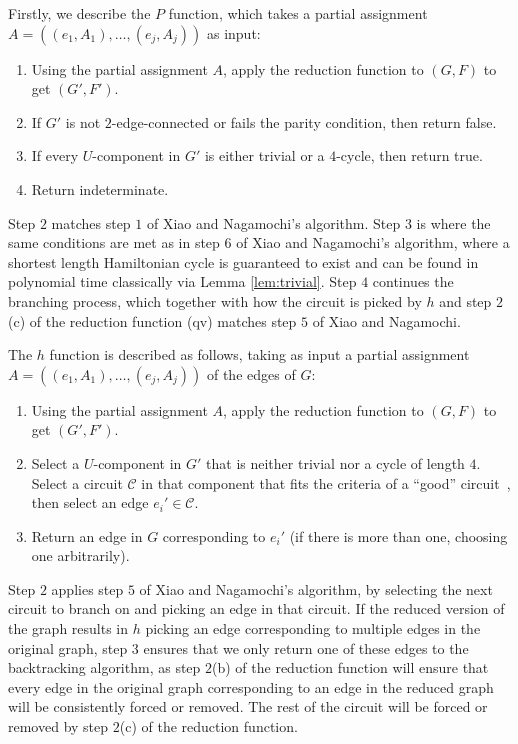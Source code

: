 Firstly, we describe the $P$ function, which takes a partial assignment $A = ((e_1, A_1),\dots,(e_j, A_j))$ as input:

\begin{enumerate}
\item Using the partial assignment $A$, apply the reduction function to $(G, F)$ to get $(G', F')$.
\item If $G'$ is not $2$-edge-connected or fails the parity condition, then return false.
\item If every $U$-component in $G'$ is either trivial or a $4$-cycle, then return true.
\item Return indeterminate.
\end{enumerate}

Step $2$ matches step $1$ of Xiao and Nagamochi's algorithm. Step $3$ is where the same conditions are met as in step $6$ of Xiao and Nagamochi's algorithm, where a shortest length Hamiltonian cycle is guaranteed to exist and can be found in polynomial time classically via Lemma \ref{lem:trivial}. Step $4$ continues the branching process, which together with how the circuit is picked by $h$ and step $2$(c) of the reduction function (qv) matches step $5$ of Xiao and Nagamochi.

The $h$ function is described as follows, taking as input a partial assignment $A = ((e_1, A_1),\dots,(e_j, A_j))$ of the edges of $G$:

\begin{enumerate}
\item Using the partial assignment $A$, apply the reduction function to $(G, F)$ to get $(G', F')$.
\item Select a $U$-component in $G'$ that is neither trivial nor a cycle of length $4$. Select a circuit $\mathcal{C}$ in that component that fits the criteria of a ``good'' circuit~\cite{xiao2016degree3}, then select an edge $e_i' \in \mathcal{C}$.
\item Return an edge in $G$ corresponding to $e_i'$ (if there is more than one, choosing one arbitrarily).
\end{enumerate}

Step $2$ applies step $5$ of Xiao and Nagamochi's algorithm, by selecting the next circuit to branch on and picking an edge in that circuit. If the reduced version of the graph results in $h$ picking an edge corresponding to multiple edges in the original graph, step $3$ ensures that we only return one of these edges to the backtracking algorithm, as step $2$(b) of the reduction function will ensure that every edge in the original graph corresponding to an edge in the reduced graph will be consistently forced or removed. The rest of the circuit will be forced or removed by step $2$(c) of the reduction function.

